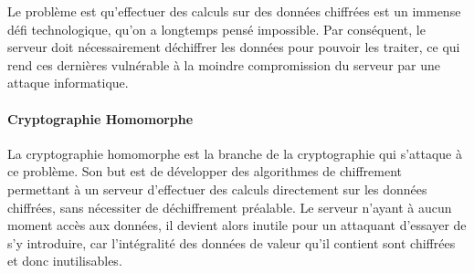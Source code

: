 Le problème est qu'effectuer des calculs sur des données chiffrées est un immense défi technologique, qu'on a longtemps pensé impossible. Par conséquent, le serveur doit nécessairement déchiffrer les données pour pouvoir les traiter, ce qui rend ces dernières vulnérable à la moindre compromission du serveur par une attaque informatique.


\paragraph{Cryptographie Homomorphe}
La cryptographie homomorphe est la branche de la cryptographie qui s'attaque à ce problème. Son but est de développer des algorithmes de chiffrement permettant à un serveur d'effectuer des calculs directement sur les données chiffrées, sans nécessiter de déchiffrement préalable. Le serveur n'ayant à aucun moment accès aux données, il devient alors inutile pour un attaquant d'essayer de s'y introduire, car l'intégralité des données de valeur qu'il contient sont chiffrées et donc inutilisables.




